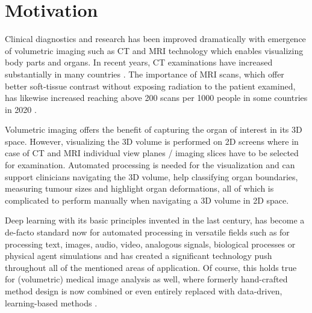 \section{Motivation} %
    Clinical diagnostics and research has been improved dramatically with emergence of volumetric imaging such as \ac{CT} and \ac{MRI} technology which enables visualizing body parts and organs.
    In recent years, \ac{CT} examinations have increased substantially in many countries \citep{westmark2023increasing, masjedi2020european, martella2023diagnostic}. The importance of \ac{MRI} scans, which offer better soft-tissue contrast without exposing radiation to the patient examined, has likewise increased reaching above 200 scans per 1000 people in some countries in 2020 \citep{martella2023diagnostic}.

    Volumetric imaging offers the benefit of capturing the organ of interest in its \ac{3D} space. However, visualizing the \ac{3D} volume is performed on \ac{2D} screens where in case of \ac{CT} and \ac{MRI}
    individual view planes / imaging slices have to be selected for examination. Automated processing is needed
    for the visualization
    and can support clinicians navigating the \ac{3D} volume, help classifying organ boundaries, measuring tumour sizes and highlight organ deformations, all of which is complicated to perform manually when navigating a \ac{3D} volume in \ac{2D} space.

    Deep learning with its basic principles invented in the last century, has become a de-facto standard now for automated processing in versatile fields such as for processing text, images, audio, video, analogous signals, biological processes or physical agent simulations
    \citep{%
        ouyang2022training, %
        kirillov2023segment, %
        birtchnell2018listening,%
        huang2020movienet,%
        sahoo2020machine,%
        jumper2021highly,%
        makoviychuk2021isaac,%
    }
    and has created a significant technology push throughout all of the mentioned areas of application.
    Of course, this holds true for (volumetric) medical image analysis as well, where formerly hand-crafted method design is now combined or even entirely replaced with data-driven, learning-based methods \citep{hosny2018artificial, rajpurkar2022ai}.


